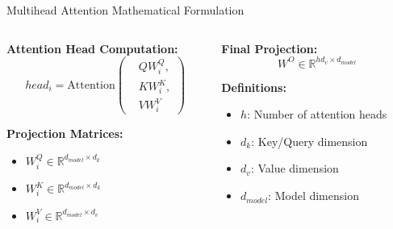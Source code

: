 \documentclass[serif, aspectratio=169]{beamer}
\begin{document}
\begin{frame}{Multihead Attention Mathematical Formulation}
	\begin{columns}
		\begin{column}{0.5\textwidth}
			\textbf{Attention Head Computation:}
			\begin{equation*}
				head_i = \text{Attention}\left(
				\begin{aligned}
					&QW^Q_i, \\
					&KW^K_i, \\
					&VW^V_i
				\end{aligned}
				\right)
			\end{equation*}
			
			\textbf{Projection Matrices:}
			\begin{itemize}
				\item $W^Q_i \in \mathbb{R}^{d_{model} \times d_k}$
				\item $W^K_i \in \mathbb{R}^{d_{model} \times d_k}$
				\item $W^V_i \in \mathbb{R}^{d_{model} \times d_v}$
			\end{itemize}
		\end{column}
		\begin{column}{0.5\textwidth}
			\textbf{Final Projection:}
			\begin{equation*}
				W^O \in \mathbb{R}^{hd_v \times d_{model}}
			\end{equation*}
			
			\textbf{Definitions:}
			\begin{itemize}
				\item $h$: Number of attention heads
				\item $d_k$: Key/Query dimension
				\item $d_v$: Value dimension
				\item $d_{model}$: Model dimension
			\end{itemize}
		\end{column}
	\end{columns}
\end{frame}
\end{document}

